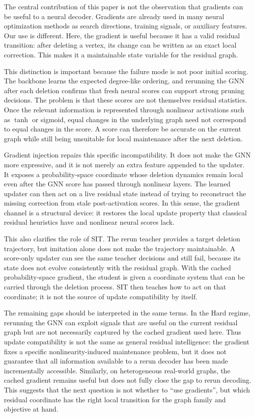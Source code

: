 \documentclass[mathematics,article,submit,pdftex,moreauthors]{Definitions/mdpi}
\begin{document}
The central contribution of this paper is not the observation that gradients can be
useful to a neural decoder. Gradients are already used in many neural optimization
methods as search directions, training signals, or auxiliary features. Our use is
different. Here, the gradient is useful because it has a valid residual transition:
after deleting a vertex, its change can be written as an exact local correction. This
makes it a maintainable state variable for the residual graph.

This distinction is important because the failure mode is not poor initial scoring.
The backbone learns the expected degree-like ordering, and rerunning the GNN after
each deletion confirms that fresh neural scores can support strong pruning decisions.
The problem is that these scores are not themselves residual statistics. Once the
relevant information is represented through nonlinear activations such as $\tanh$ or
sigmoid, equal changes in the underlying graph need not correspond to equal changes
in the score. A score can therefore be accurate on the current graph while still
being unsuitable for local maintenance after the next deletion.

Gradient injection repairs this specific incompatibility. It does not make the GNN
more expressive, and it is not merely an extra feature appended to the updater. It
exposes a probability-space coordinate whose deletion dynamics remain local even
after the GNN score has passed through nonlinear layers. The learned updater can
then act on a live residual state instead of trying to reconstruct the missing
correction from stale post-activation scores. In this sense, the gradient channel is
a structural device: it restores the local update property that classical residual
heuristics have and nonlinear neural scores lack.

This also clarifies the role of SIT. The rerun teacher provides a target deletion
trajectory, but imitation alone does not make the trajectory maintainable. A
score-only updater can see the same teacher decisions and still fail, because its
state does not evolve consistently with the residual graph. With the cached
probability-space gradient, the student is given a coordinate system that can be
carried through the deletion process. SIT then teaches how to act on that coordinate;
it is not the source of update compatibility by itself.

The remaining gaps should be interpreted in the same terms. In the Hard regime,
rerunning the GNN can exploit signals that are useful on the current residual graph
but are not necessarily captured by the cached gradient used here. Thus update
compatibility is not the same as general residual intelligence: the gradient fixes a
specific nonlinearity-induced maintenance problem, but it does not guarantee that all
information available to a rerun decoder has been made incrementally accessible.
Similarly, on heterogeneous real-world graphs, the cached gradient remains useful
but does not fully close the gap to rerun decoding. This suggests that the next
question is not whether to ``use gradients'', but which residual coordinate has the
right local transition for the graph family and objective at hand.
\end{document}
